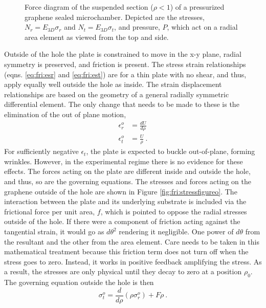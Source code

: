 \begin{figure}
	\begin{center}
	
	\end{center}
	\caption[Force diagram of the suspended section of a pressurized graphene sealed microchamber]{\label{fig:fri:stressfigurei} Force diagram of the suspended section ($\rho<1$) of a pressurized graphene sealed microchamber. Depicted are the stresses, $N_r=E_{3D} \sigma_r$ and $N_t=E_{3D} \sigma_t$, and pressure, $P$, which act on a radial area element as viewed from the top and side.}
\end{figure}

Outside of the hole the plate is constrained to move in the x-y plane, radial symmetry is preserved, and friction is present. 
The stress strain relationships (eqns. \ref{eq:fri:esr} and \ref{eq:fri:est}) are for a thin plate with no shear, and thus, apply equally well outside the hole as inside.
The strain displacement relationships are based on the geometry of a general radially symmetric differential element.
The only change that needs to be made to these is the elimination of the out of plane motion, 
\begin{align}
	\epsilon_r^o&=\frac{dU}{d\rho} \label{eq:fri:edro}\\
	\epsilon_t^o&=\frac{U}{\rho} \label{eq:fri:edto} \ .
\end{align}
For sufficiently negative $\epsilon_t$, the plate is expected to buckle out-of-plane, forming wrinkles.
However, in the experimental regime there is no evidence for these effects.
The forces acting on the plate are different inside and outside the hole, and thus, so are the governing equations.
The stresses and forces acting on the graphene outside of the hole are shown in Figure \ref{fig:fri:stressfigureo}.
The interaction between the plate and its underlying substrate is included via the frictional force per unit area, $f$, which is pointed to oppose the radial stresses outside of the hole.
If there were a component of friction acting against the tangential strain, it would go as $d \theta^2$ rendering it negligible.
One power of $d \theta$ from the resultant and the other from the area element.
Care needs to be taken in this mathematical treatment because this friction term does not turn off when the stress goes to zero.
Instead, it works in positive feedback amplifying the stress. 
As a result, the stresses are only physical until they decay to zero at a position $\rho_0$.
The governing equation outside the hole is then
\begin{equation}
	\sigma_t^o=\frac{d}{d\rho}(\rho \sigma_r^o)+F \rho  \ .
	\label{eq:fri:g1o}
\end{equation}
